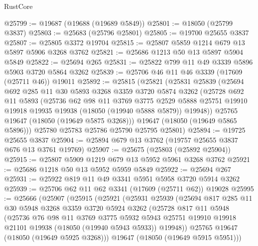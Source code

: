 \begin{lexlean}{RustCore}
\begin{coremodule}
@25799 := @19687 (@19688 (@19689 @5849))
@25801 := @18050 (@25799 @3837)
@25803 := @25683 (@25796 @25801)
@25805 := @19700 @25655 @3837
@25807 := @25805 @3372 @19704
@25815 := @25807 @5859 @1214 @679 @13 @5897 @5906 @3268 @3762
@25821 := @25686 @1213 @50 @13 @5897 @5904 @5849
@25822 := @25694 @265
@25831 := @25822 @799 @11 @49 @3339 @5896 @5903 @3720 @5864 @3262
@25839 := @25706 @46 @11 @46 @3339 (@17609 (@25711 @46)) @19011
@25892 := @25815
    (@25821
      (@25831
        @25839
        (@25694
          @692
          @285
          @11
          @30
          @5893
          @3268
          @3359
          @3720
          @5874
          @3262
          (@25728
            @692
            @11
            @5893
            (@25736
              @62
              @98
              @11
              @3769
              @3775
              @2529
              @5888
              @25751
              @19910
              @19918
              @19935
              @19938
              (@18050 (@19940 @5888 @5879))
              @19948))
          @25765
          @19647
          (@18050 (@19649 @5875 @3268)))
        @19647
        (@18050 (@19649 @5865 @5896)))
      @25780
      @25783
      @25786
      @25790
      @25795
      @25801)
@25894 := @19725 @25655 @3837
@25904 := @25894 @679 @13 @3762 (@19757 @25655 @3837 @676 @13 @3761 @19769)
@25907 := @25675 (@25803 (@25892 @25904))
@25915 := @25807 @5909 @1219 @679 @13 @5952 @5961 @3268 @3762
@25921 := @25686 @1218 @50 @13 @5952 @5959 @5849
@25922 := @25694 @267
@25931 := @25922 @819 @11 @49 @3341 @5951 @5958 @3720 @5914 @3262
@25939 := @25706 @62 @11 @62 @3341 (@17609 (@25711 @62)) @19028
@25995 := @25666
    (@25907
      (@25915
        (@25921
          (@25931
            @25939
            (@25694
              @817
              @285
              @11
              @30
              @5948
              @3268
              @3359
              @3720
              @5924
              @3262
              (@25728
                @817
                @11
                @5948
                (@25736
                  @76
                  @98
                  @11
                  @3769
                  @3775
                  @5932
                  @5943
                  @25751
                  @19910
                  @19918
                  @21101
                  @19938
                  (@18050 (@19940 @5943 @5933))
                  @19948))
              @25765
              @19647
              (@18050 (@19649 @5925 @3268)))
            @19647
            (@18050 (@19649 @5915 @5951)))

\end{coremodule}
\end{lexlean}
